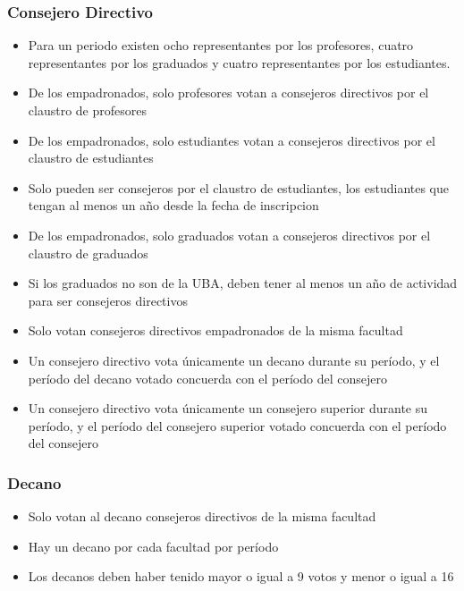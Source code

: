 \documentclass[a4paper, 10pt, twoside]{article}
\begin{document}
\subsubsection{Consejero Directivo}

\begin{itemize}
\item Para un periodo existen ocho representantes por los profesores, cuatro representantes por los graduados y cuatro representantes por los estudiantes.
\item De los empadronados, solo profesores votan a consejeros directivos por el claustro de profesores
\item De los empadronados, solo estudiantes votan a consejeros directivos por el claustro de estudiantes
\item Solo pueden ser consejeros por el claustro de estudiantes, los estudiantes que tengan al menos un año desde la fecha de inscripcion
\item De los empadronados, solo graduados votan a consejeros directivos por el claustro de graduados
\item Si los graduados no son de la UBA, deben tener al menos un año de actividad para ser consejeros directivos
\item Solo votan consejeros directivos empadronados de la misma facultad
\item Un consejero directivo vota únicamente un decano durante su período, y el período del decano votado concuerda con el período del consejero
\item Un consejero directivo vota únicamente un consejero superior durante su período, y el período del consejero superior votado concuerda con el período del consejero
\end{itemize}


\subsubsection{Decano}

\begin{itemize}
\item Solo votan al decano consejeros directivos de la misma facultad
\item Hay un decano por cada facultad por período
\item Los decanos deben haber tenido mayor o igual a 9 votos y menor o igual a 16
\end{itemize}
\end{document}
